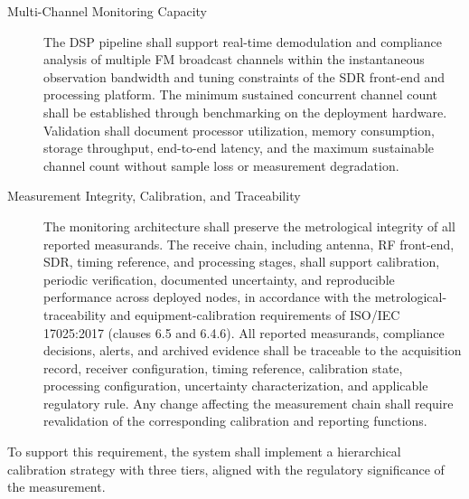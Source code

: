 \documentclass[11pt]{article}
\begin{document}
\begin{description}
\item[Multi-Channel Monitoring Capacity] The DSP pipeline shall support real-time demodulation and compliance analysis of multiple FM broadcast channels within the instantaneous observation bandwidth and tuning constraints of the SDR front-end and processing platform. The minimum sustained concurrent channel count shall be established through benchmarking on the deployment hardware. Validation shall document processor utilization, memory consumption, storage throughput, end-to-end latency, and the maximum sustainable channel count without sample loss or measurement degradation.

\item[Measurement Integrity, Calibration, and Traceability] The monitoring architecture shall preserve the metrological integrity of all reported measurands. The receive chain, including antenna, RF front-end, SDR, timing reference, and processing stages, shall support calibration, periodic verification, documented uncertainty, and reproducible performance across deployed nodes, in accordance with the metrological-traceability and equipment-calibration requirements of ISO/IEC 17025:2017 (clauses 6.5 and 6.4.6). All reported measurands, compliance decisions, alerts, and archived evidence shall be traceable to the acquisition record, receiver configuration, timing reference, calibration state, processing configuration, uncertainty characterization, and applicable regulatory rule. Any change affecting the measurement chain shall require revalidation of the corresponding calibration and reporting functions.

\end{description}

To support this requirement, the system shall implement a hierarchical calibration strategy with three tiers, aligned with the regulatory significance of the measurement.
\end{document}
